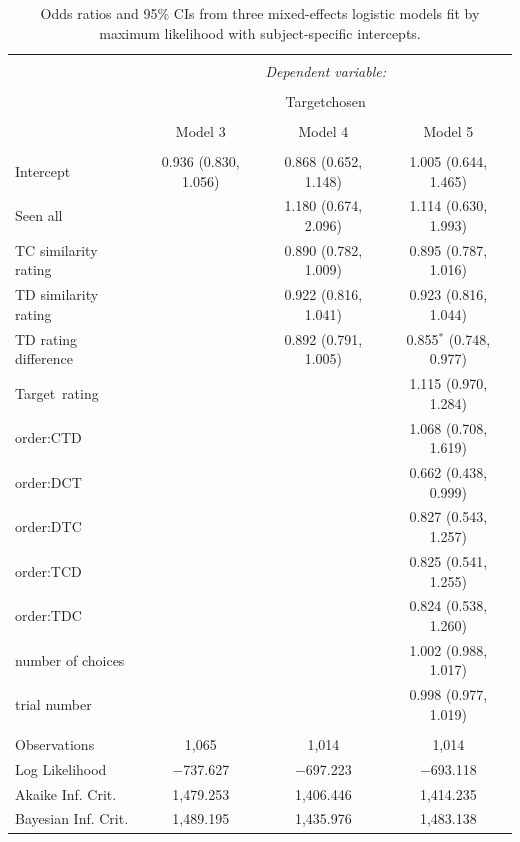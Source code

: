 \documentclass[12pt, a4paper]{article}
\begin{document}
\begin{appendices}
\begin{table}[htb!]
\centering
  \begin{threeparttable}
    \caption{Odds ratios and 95\% CIs from three mixed-effects logistic models fit by maximum likelihood with subject-specific intercepts.}
  \label{firstchoice}
\begin{tabular}{@{\extracolsep{5pt}}lccc} 
\\[-1.8ex]\hline 
\hline \\[-1.8ex] 
 & \multicolumn{3}{c}{\textit{Dependent variable:}} \\ 
\cline{2-4} 
\\[-1.8ex] & \multicolumn{3}{c}{Targetchosen} \\ 
\\[-1.8ex] & Model 3 & Model 4 & Model 5\\ 
\hline \\[-1.8ex] 
Intercept & 0.936 (0.830, 1.056) & 0.868 (0.652, 1.148) & 1.005 (0.644, 1.465) \\ 
 Seen all &  & 1.180 (0.674, 2.096) & 1.114 (0.630, 1.993) \\ 
  TC similarity rating &  & 0.890 (0.782, 1.009) & 0.895 (0.787, 1.016) \\ 
   TD similarity rating &  & 0.922 (0.816, 1.041) & 0.923 (0.816, 1.044) \\ 
  TD rating difference &  & 0.892 (0.791, 1.005) & 0.855$^{*}$ (0.748, 0.977) \\ 
  Target\ rating &  &  & 1.115 (0.970, 1.284) \\ 
  order:CTD &  &  & 1.068 (0.708, 1.619) \\ 
  order:DCT &  &  & 0.662 (0.438, 0.999) \\ 
  order:DTC &  &  & 0.827 (0.543, 1.257) \\ 
  order:TCD &  &  & 0.825 (0.541, 1.255) \\ 
  order:TDC &  &  & 0.824 (0.538, 1.260) \\ 
  number of choices &  &  & 1.002 (0.988, 1.017) \\ 
  trial number &  &  & 0.998 (0.977, 1.019) \\ 
 \hline \\[-1.8ex] 
Observations & 1,065 & 1,014 & 1,014 \\ 
Log Likelihood & $-$737.627 & $-$697.223 & $-$693.118 \\ 
Akaike Inf. Crit. & 1,479.253 & 1,406.446 & 1,414.235 \\ 
Bayesian Inf. Crit. & 1,489.195 & 1,435.976 & 1,483.138 \\ 

\end{tabular}
\end{threeparttable}
\end{table}
\end{appendices}
\end{document}
